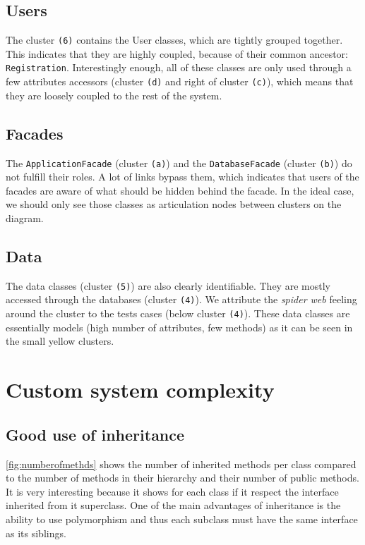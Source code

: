\subsection{Users}
The cluster \texttt{(6)} contains the User classes, which are tightly grouped together. This indicates that they are highly coupled, because of their common ancestor: \texttt{Registration}. Interestingly enough, all of these classes are only used through a few attributes accessors (cluster \texttt{(d)} and right of cluster \texttt{(c)}), which means that they are loosely coupled to the rest of the system.

\subsection{Facades}
The \texttt{ApplicationFacade} (cluster \texttt{(a)}) and the \texttt{DatabaseFacade} (cluster \texttt{(b)}) do not fulfill their roles. A lot of links bypass them, which indicates that users of the facades are aware of what should be hidden behind the facade. In the ideal case, we should only see those classes as articulation nodes between clusters on the diagram.

\subsection{Data}
The data classes (cluster \texttt{(5)}) are also clearly identifiable. They are mostly accessed through the databases (cluster \texttt{(4)}). We attribute the \textit{spider web} feeling around the cluster to the tests cases (below cluster \texttt{(4)}). These data classes are essentially models (high number of attributes, few methods) as it can be seen in the small yellow clusters.

\section{Custom system complexity}

\subsection{Good use of inheritance}

\ref{fig:numberofmethds} shows the number of inherited methods per class compared to the number of methods in their hierarchy and their number of public methods.
It is very interesting because it shows for each class if it respect the interface inherited from it superclass. One of the main advantages of inheritance is the ability to use polymorphism and thus each subclass must have the same interface as its siblings.

